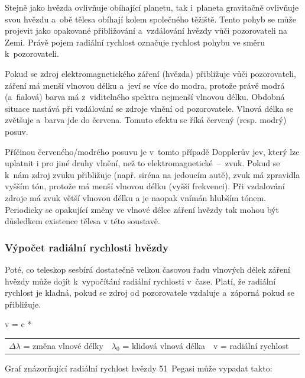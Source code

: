 \documentclass[a4paper,12pt]{article}
\begin{document}
{{Stejně jako hvězda ovlivňuje obíhající planetu, tak i~planeta gravitačně ovlivňuje svou hvězdu a~obě tělesa obíhají kolem společného těžiště. Tento pohyb se může projevit jako opakované přibližování a~vzdálování hvězdy vůči pozorovateli na Zemi. Právě pojem radiální rychlost označuje rychlost pohybu ve směru k~pozorovateli.~\cite{methods}

Pokud se zdroj elektromagnetického záření (hvězda) přibližuje vůči pozorovateli, záření má menší vlnovou délku a~jeví se více do modra, protože právě modrá (a~fialová) barva má z~viditelného spektra nejmenší vlnovou délku. Obdobná situace nastává při vzdálování se zdroje vlnění od pozorovatele. Vlnová délka se zvětšuje a~barva jde do červena. Tomuto efektu se říká červený (resp. modrý) posuv.~\cite{methods}

\drawgimp

Příčinou červeného/modrého posuvu je v~tomto případě Dopplerův jev, který lze uplatnit i pro jiné druhy vlnění, než to elektromagnetické~--~zvuk. Pokud se k~nám zdroj zvuku přibližuje (např. siréna na jedoucím autě), zvuk má zpravidla vyšším tón, protože má menší vlnovou délku (vyšší frekvenci). Při vzdalování zdroje má zvuk větší vlnovou délku a je naopak vnímán hlubším tónem.~\cite{radialvelocity} Periodicky se opakující změny ve vlnové délce záření hvězdy tak mohou být důsledkem existence tělesa v této soustavě.~\cite{methods}

\subsubsection{Výpočet radiální rychlosti hvězdy}

Poté, co teleskop sesbírá dostatečně velkou časovou řadu vlnových délek záření hvězdy může dojít k~vypočítání radiální rychlosti v~čase. Platí, že radiální rychlost je kladná, pokud se zdroj od pozorovatele vzdaluje a~záporná pokud se přibližuje.~\cite{methods}

 {v = c * }{
\begin{tabular}{lll}
	$\Delta\lambda$ = změna vlnové délky & $\lambda_0$ = klidová vlnová délka & v = radiální rychlost \
\end{tabular}
}

Graf znázorňující radiální rychlost hvězdy 51~Pegasi může vypadat takto:

\data{1}{51pegasi}

}}
\end{document}
